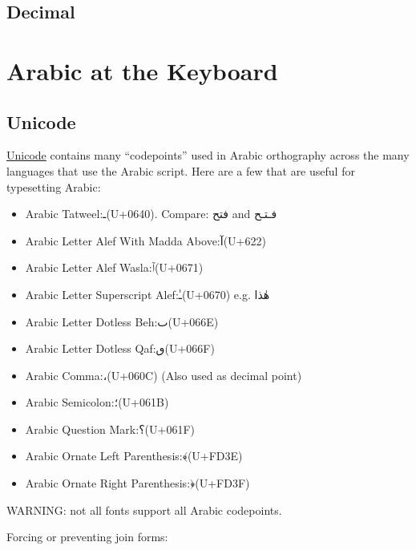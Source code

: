 \documentclass[11pt]{article}
\begin{document}
\subsection{Decimal}

\section{Arabic at the Keyboard}

\subsection{Unicode}

\href{https://en.wikipedia.org/wiki/Arabic_script_in_Unicode}{Unicode}
contains many “codepoints” used in Arabic orthography across the many
languages that use the Arabic script. Here are a few that are useful
for typesetting Arabic:

\begin{itemize}
\item Arabic Tatweel:\quad\textarabic{ـ}\quad (U+0640). Compare: \textarabic{فتح} and
  \textarabic{فـتـح}
\item Arabic Letter Alef With Madda Above:\quad \textarabic{آ}\quad (U+622)
\item Arabic Letter Alef Wasla:\quad \textarabic{ٱ}\quad (U+0671)
\item Arabic Letter Superscript Alef:\quad \textarabic{ـٰ}\quad (U+0670) e.g. \textarabic{هٰذا}
\item Arabic Letter Dotless Beh:\quad \textarabic{ٮ}\quad (U+066E)
\item Arabic Letter Dotless Qaf:\quad \textarabic{ٯ}\quad (U+066F)
\item Arabic Comma:\quad \textarabic{،}\quad (U+060C) (Also used as
  decimal point)
\item Arabic Semicolon:\quad \textarabic{؛}\quad (U+061B)
\item Arabic Question Mark:\quad \textarabic{؟}\quad (U+061F)
\item Arabic Ornate Left Parenthesis:\quad \textarabic{﴾}\quad (U+FD3E)
\item Arabic Ornate Right Parenthesis:\quad \textarabic{﴿}\quad (U+FD3F)
\end{itemize}

\noindent WARNING: not all fonts support all Arabic codepoints.

\vspace{8pt}
\noindent Forcing or preventing join forms:
\end{document}
